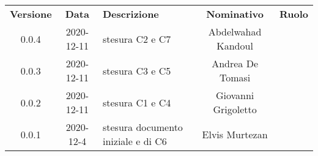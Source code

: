 {
    \renewcommand{\arraystretch}{1.5}
    \centering
    \begin{longtable}{ c c  C{4cm}  c  c }
        \rowcolor{\primaryColor}
        \textcolor{\secondaryColor}{
        \textbf{Versione}}     & \textcolor{\secondaryColor}{\textbf{Data}}       & \textcolor{\secondaryColor}
        {\textbf{Descrizione}} & \textcolor{\secondaryColor}{\textbf{Nominativo}} & \textcolor{\secondaryColor}{\textbf{Ruolo}}                          \\


		0.0.4                  & 2020-12-11                                       & stesura C2 e C7                     & Abdelwahad Kandoul & \redattore{}    \\
        0.0.3                  & 2020-12-11                                       & stesura C3 e C5    					& Andrea De Tomasi & \redattore{}    \\
        0.0.2                  & 2020-12-11                                       & stesura C1 e C4   					& Giovanni Grigoletto& \redattore{} \\        
        0.0.1                  & 2020-12-4                                       & stesura documento iniziale e di C6 & Elvis Murtezan & \responsabile{} \\
    \end{longtable}
}